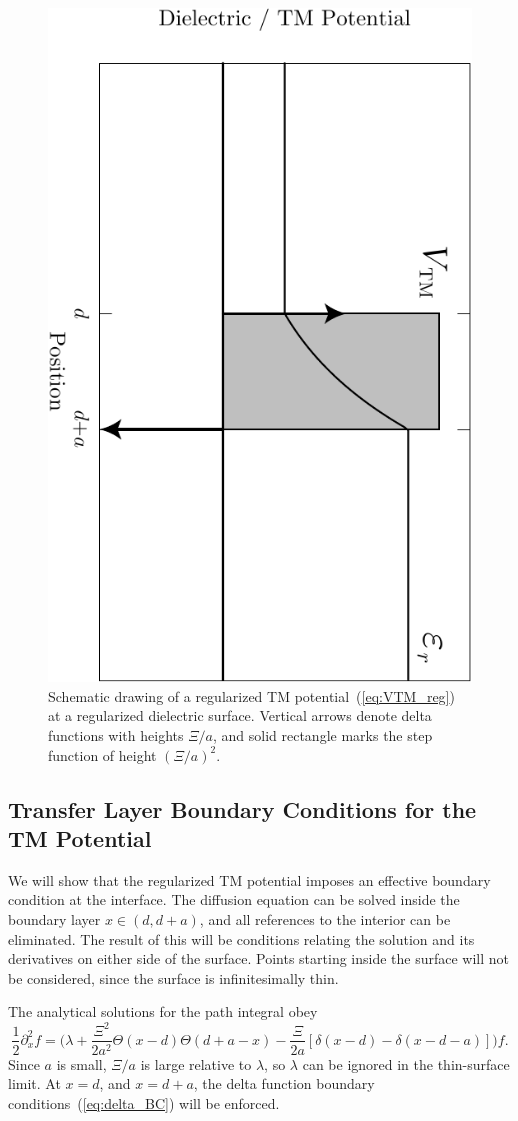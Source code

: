 \begin{figure}
  \centering
  \includegraphics[width=0.4\linewidth,angle=90]{fig/analytical/TMpot}
  \caption[Regularized TM Potential]{Schematic drawing of a regularized TM potential~(\ref{eq:VTM_reg})
    at a regularized dielectric surface.  
    Vertical arrows denote delta functions with heights $\Xi/a$, and solid rectangle marks the 
    step function of height $(\Xi/a)^2$.  }
  \label{fig:TMpot}
\end{figure}


\subsection[Transfer Layer Boundary Conditions for the \\ TM Potential]
{Transfer Layer Boundary Conditions for the TM Potential}

We will show that the regularized TM potential imposes an effective boundary condition at the interface. 
The diffusion equation can be solved inside the boundary layer $x\in(d,d+a)$, and all references 
to the interior can be eliminated.  The result of this will be conditions relating
the solution and its derivatives on either side of the surface.
Points starting inside the surface will not be considered, since the surface is infinitesimally thin.

The analytical solutions for the path integral obey
\begin{equation}
  \frac{1}{2}\partial_x^2f =\bigg(\lambda+\frac{\Xi^2}{2a^2}\Theta(x-d)\Theta(d+a-x)
  - \frac{\Xi}{2a}[\delta(x-d)-\delta(x-d-a)]\bigg)f.
\end{equation}
Since $a$ is small, $\Xi/a$ is large relative to $\lambda$, so $\lambda$ can be ignored in the thin-surface limit.    
At $x=d$, and $x=d+a$, the delta function boundary conditions~(\ref{eq:delta_BC}) will be enforced.

